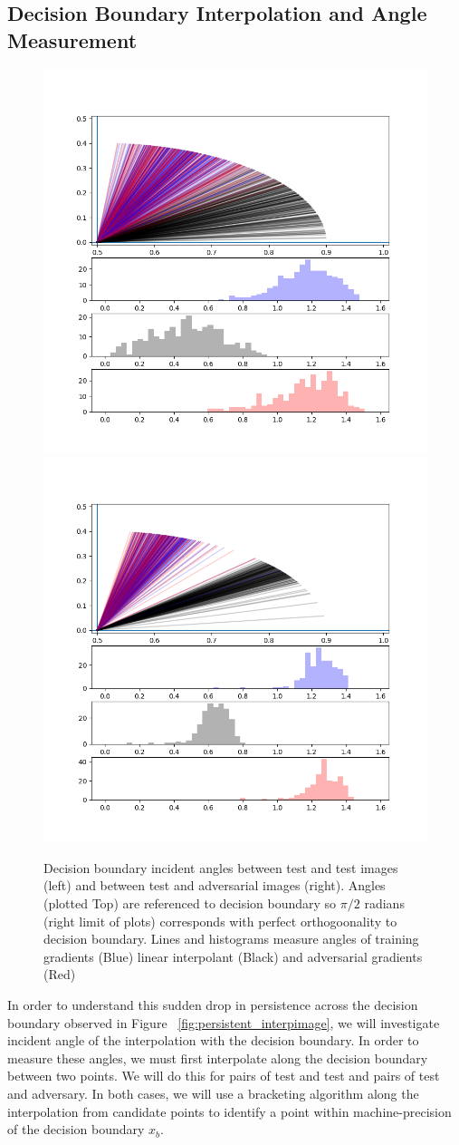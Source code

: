 \subsection{Decision Boundary Interpolation and Angle Measurement} \label{subsec:dbe}

\begin{figure}[!ht]
\centering\includegraphics[width=0.50\linewidth, trim=1.5cm 1.5cm 2cm 2cm, clip]{c3_figures/stab-mnist-C32-100-100-10-0.001-200-eval-1e-06-db_interp-angles-1stquadall199.png}\includegraphics[width=0.50\linewidth, trim=1.5cm 1.5cm 2cm 2cm, clip]{c3_figures/stab-mnist-C32-100-100-10-0.001-200-eval-1e-06-attack-db_interp-angles-1stquadall199.png}

\caption{Decision boundary incident angles between test and test images (left) and between test and adversarial images (right). Angles (plotted Top) are referenced to decision boundary so $\pi/2$ radians (right limit of plots) corresponds with perfect orthogoonality to decision boundary. Lines and histograms measure angles of training gradients (Blue) linear interpolant (Black) and adversarial gradients (Red)}
\label{fig:dba}
\end{figure}

In order to understand this sudden drop in persistence across the decision boundary observed in Figure ~\ref{fig:persistent_interpimage}, we will investigate incident angle of the interpolation with the decision boundary. In order to measure these angles, we must first interpolate along the decision boundary between two points. We will do this for pairs of test and test and pairs of test and adversary. In both cases, we will use a bracketing algorithm along the interpolation from candidate points to identify a point within machine-precision of the decision boundary $x_b$. 

